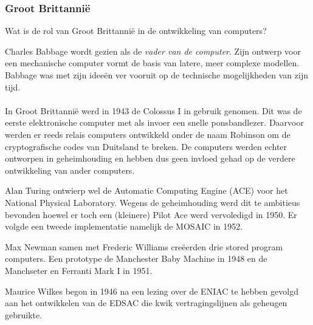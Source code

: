 \documentclass[../main.tex]{subfiles}
\begin{document}
\subsubsection{Groot Brittanni\"e}
\begin{question}
Wat is de rol van Groot Brittanni\"e in de ontwikkeling van computers?
\end{question}
\begin{solution}
Charles Babbage wordt gezien als de \emph{vader van de computer}. Zijn ontwerp voor een mechanische computer vormt de basis van latere, meer complexe modellen. Babbage was met zijn idee\"en ver vooruit op de technische mogelijkheden van
zijn tijd.
\\\\
In Groot Brittanni\"e werd in 1943 de Colossus I in gebruik genomen. Dit was de eerste elektronische computer met als invoer een snelle ponsbandlezer.
Daarvoor werden er reeds relais computers ontwikkeld onder de naam Robinson om de cryptografische codes van Duitsland te breken.
De computers werden echter ontworpen in geheimhouding en hebben dus geen invloed gehad op de verdere ontwikkeling van ander computers.

Alan Turing ontwierp wel de Automatic Computing Engine (ACE) voor het National Physical Laboratory.
Wegens de geheimhouding werd dit te ambitieus bevonden hoewel er toch een (kleinere) Pilot Ace werd vervoledigd in 1950.
Er volgde een tweede implementatie namelijk de MOSAIC in 1952.

Max Newman samen met Frederic Williams cre\"eerden drie stored program computers.
Een prototype de Manchester Baby Machine in 1948 en de Manchseter en Ferranti Mark I in 1951.

Maurice Wilkes  begon in 1946 na een lezing over de ENIAC te hebben gevolgd aan het ontwikkelen van de EDSAC die kwik vertragingslijnen als geheugen gebruikte.
\end{solution}
\end{document}
